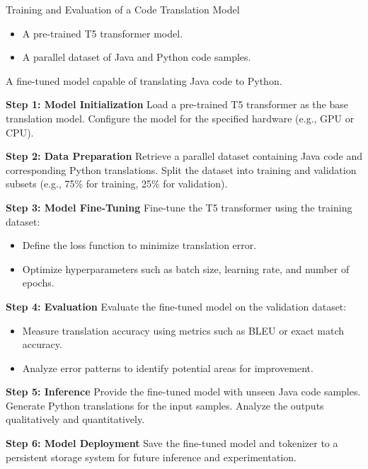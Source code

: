 \documentclass{dhbenelux}
\begin{document}
\begin{algorithm}
\caption{Training and Evaluation of a Code Translation Model}
\label{alg:code_translation}
\begin{algorithmic}[1]
\Require 
\begin{itemize}
    \item A pre-trained T5 transformer model.
    \item A parallel dataset of Java and Python code samples.
\end{itemize}
\Ensure A fine-tuned model capable of translating Java code to Python.

\State \textbf{Step 1: Model Initialization}
\State Load a pre-trained T5 transformer as the base translation model.
\State Configure the model for the specified hardware (e.g., GPU or CPU).

\State \textbf{Step 2: Data Preparation}
\State Retrieve a parallel dataset containing Java code and corresponding Python translations.
\State Split the dataset into training and validation subsets (e.g., 75\% for training, 25\% for validation).

\State \textbf{Step 3: Model Fine-Tuning}
\State Fine-tune the T5 transformer using the training dataset:
\begin{itemize}
    \item Define the loss function to minimize translation error.
    \item Optimize hyperparameters such as batch size, learning rate, and number of epochs.
\end{itemize}

\State \textbf{Step 4: Evaluation}
\State Evaluate the fine-tuned model on the validation dataset:
\begin{itemize}
    \item Measure translation accuracy using metrics such as BLEU or exact match accuracy.
    \item Analyze error patterns to identify potential areas for improvement.
\end{itemize}

\State \textbf{Step 5: Inference}
\State Provide the fine-tuned model with unseen Java code samples.
\State Generate Python translations for the input samples.
\State Analyze the outputs qualitatively and quantitatively.

\State \textbf{Step 6: Model Deployment}
\State Save the fine-tuned model and tokenizer to a persistent storage system for future inference and experimentation.

\end{algorithmic}
\end{algorithm}



%
%
%
%
%
\end{document}
